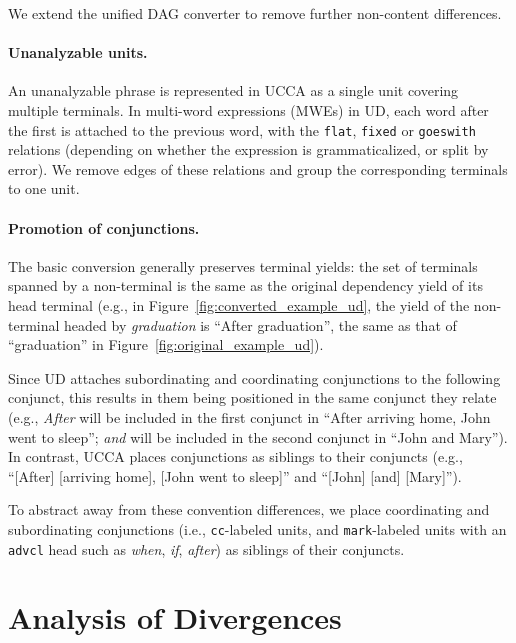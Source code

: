 \documentclass[11pt,a4paper]{article}
\begin{document}
We extend the unified DAG converter to remove further non-content differences.

\paragraph{Unanalyzable units.}
An unanalyzable phrase is represented in UCCA as a single unit covering multiple terminals.
In multi-word expressions (MWEs) in UD, each word after the first is attached to the previous word,
with the \texttt{flat}, \texttt{fixed} or \texttt{goeswith} relations
(depending on whether the expression is grammaticalized, or split by error).
We remove edges of these relations and group the corresponding terminals to one unit.

\paragraph{Promotion of conjunctions.}
The basic conversion generally preserves terminal yields:
the set of terminals spanned by a non-terminal is the same
as the original dependency yield of its head terminal
(e.g., in Figure~\ref{fig:converted_example_ud}, the yield of the non-terminal
headed by \textit{graduation} is ``After graduation'', the same as that of ``graduation''
in Figure~\ref{fig:original_example_ud}).

Since UD attaches subordinating and coordinating conjunctions to the following conjunct,
this results in them being positioned in the same conjunct they relate (e.g.,
\textit{After} will be included in the first conjunct in ``After arriving home, John went to sleep'';
\textit{and} will be included in the second conjunct in ``John and Mary'').
In contrast, UCCA places conjunctions as siblings to their conjuncts (e.g.,
``[After] [arriving home], [John went to sleep]'' and ``[John] [and] [Mary]''). 

To abstract away from these convention differences,
we place 
coordinating and subordinating conjunctions 
(i.e., \texttt{cc}-labeled units, and \texttt{mark}-labeled units with an \texttt{advcl} head such 
as \textit{when}, \textit{if}, \textit{after}) as siblings of their conjuncts.


\section{Analysis of Divergences}\label{sec:analysis}
\end{document}
